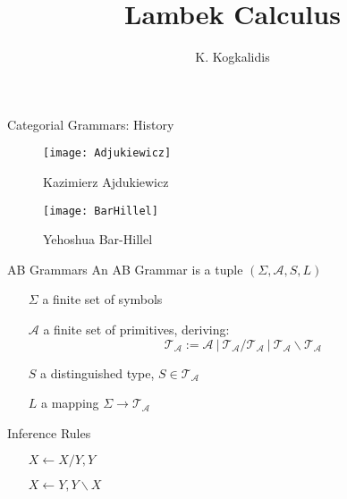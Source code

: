 \documentclass{beamer}
\title{Lambek Calculus}
\author{K. Kogkalidis}
\institute{Logic \& Language 2020}
\newcommand{\li}{\!\multimap\!}
\begin{document}
\date{}
\maketitle

%

\begin{frame}{Categorial Grammars: History}
	\small
	\begin{minipage}[t]{0.4\textwidth}
		\begin{minipage}[t]{1\textwidth}
		\begin{figure}
		\texttt{[image: Adjukiewicz]}
		\caption{Kazimierz Ajdukiewicz}
		\end{figure}
		\end{minipage}
		\vfill
		\begin{minipage}[t]{1\textwidth}
		\begin{figure}
		\texttt{[image: BarHillel]}
		\caption{Yehoshua Bar-Hillel}
		\end{figure}	
		\end{minipage}	
	\end{minipage}%
	\begin{minipage}[t]{0.6\textwidth}
		\begin{block}{AB Grammars}
		An AB Grammar is a tuple $\left( \Sigma, \mathcal{A}, S, L \right)$
		\begin{itemize}
		\item[$\Sigma$] a finite set of symbols
		\item[$\mathcal{A}$] a finite set of primitives, deriving:
		\[
			\mathcal{T}_\mathcal{A} := \mathcal{A} \ | \  \mathcal{T}_\mathcal{A}/\mathcal{T}_\mathcal{A} \ | \ \mathcal{T}_\mathcal{A} \backslash\mathcal{T}_\mathcal{A}
		\]
		\item[$S$] a distinguished type, $S \in \mathcal{T}_\mathcal{A}$
		\item[$L$] a mapping $\Sigma \to \mathcal{T}_\mathcal{A}$
		\end{itemize}		
		\end{block}	
		\vfill
		
		\begin{block}{Inference Rules}
		\begin{itemize}
			\item[] $X \longleftarrow X/Y, Y$
			\item[] $X \longleftarrow Y, Y\backslash X$
		\end{itemize}
		\end{block}
	\end{minipage}
\end{frame}
\end{document}

